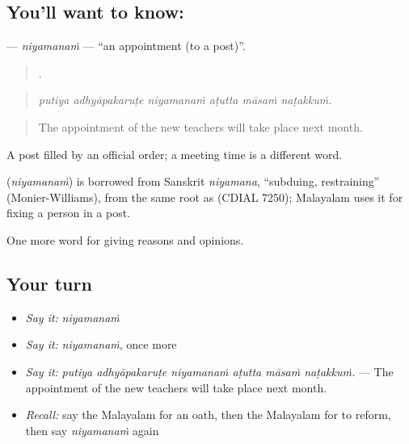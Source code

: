 \subsection*{You'll want to know: }
\textbf{} — \emph{niyamanaṁ} — \textquotedblleft{}an appointment (to a post)\textquotedblright{}.

\begin{quote}
     .
\end{quote}

\begin{quote}
\emph{putiya adhyāpakaruṭe niyamanaṁ aṭutta māsaṁ naṭakkuṁ.}
\end{quote}

\begin{quote}
The appointment of the new teachers will take place next month.
\end{quote}

A post filled by an official order; a meeting time is a different word.

\begin{cousinweb}
\textbf{} (\emph{niyamanaṁ}) is borrowed from Sanskrit \emph{niyamana}, \textquotedblleft{}subduing, restraining\textquotedblright{} (Monier-Williams), from the same root as  (CDIAL 7250); Malayalam uses it for fixing a person in a post.
\end{cousinweb}

\begin{grammarlens}[title={What you've built}]
One more word for giving reasons and opinions.
\end{grammarlens}

\subsection*{Your turn}
\begin{itemize}
\raggedright
  \item \emph{Say it:} \emph{niyamanaṁ}
  \item \emph{Say it:} \emph{niyamanaṁ}, once more
  \item \emph{Say it:} \emph{putiya adhyāpakaruṭe niyamanaṁ aṭutta māsaṁ naṭakkuṁ.} — The appointment of the new teachers will take place next month.
  \item \emph{Recall:} say the Malayalam for an oath, then the Malayalam for to reform, then say \emph{niyamanaṁ} again
\end{itemize}

